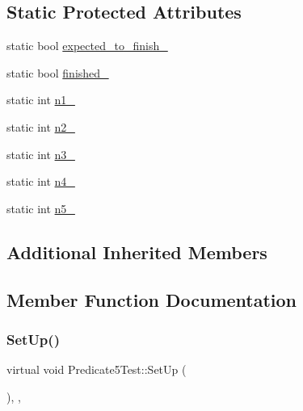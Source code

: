 \subsection*{Static Protected Attributes}
\begin{DoxyCompactItemize}
\item 
static bool \hyperlink{class_predicate5_test_aa502b7a330cc5c64785ff59aad3ef180}{expected\+\_\+to\+\_\+finish\+\_\+}
\item 
static bool \hyperlink{class_predicate5_test_a5003aada64accf06cdb28b1ff1797353}{finished\+\_\+}
\item 
static int \hyperlink{class_predicate5_test_a356c8e361185b234a417ed895eb14e38}{n1\+\_\+}
\item 
static int \hyperlink{class_predicate5_test_a5bf48ba65b7baf20abe1d2af90779ce0}{n2\+\_\+}
\item 
static int \hyperlink{class_predicate5_test_a63723efb915dbf418c31b97b64dabc0e}{n3\+\_\+}
\item 
static int \hyperlink{class_predicate5_test_a5d66aa58badddc8d3d8070a93c0558d6}{n4\+\_\+}
\item 
static int \hyperlink{class_predicate5_test_a96badba6366235a2771b27ea014bd9ce}{n5\+\_\+}
\end{DoxyCompactItemize}
\subsection*{Additional Inherited Members}


\subsection{Member Function Documentation}
\mbox{\label{class_predicate5_test_a42bf622b4f2134d0497cd42fd2e3e1df}} 
\subsubsection{\texorpdfstring{Set\+Up()}{SetUp()}}
{\footnotesize\ttfamily virtual void Predicate5\+Test\+::\+Set\+Up (\begin{DoxyParamCaption}{ }\end{DoxyParamCaption})\hspace{0.3cm}{\ttfamily [inline]}, {\ttfamily [protected]}, {\ttfamily [virtual]}}



